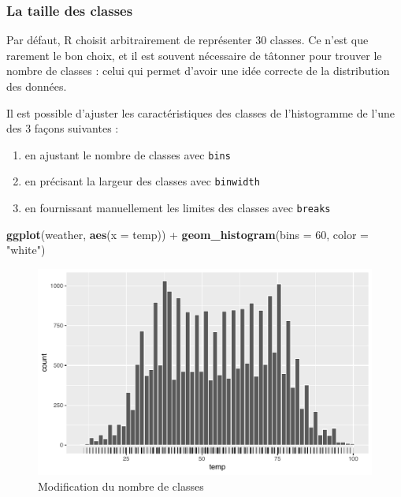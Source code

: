 \documentclass[a4paperpaper,]{article}
\newenvironment{Shaded}{\begin{snugshade}}{\end{snugshade}}
\newcommand{\DataTypeTok}[1]{\textcolor[rgb]{0.00,0.34,0.68}{#1}}
\newcommand{\DecValTok}[1]{\textcolor[rgb]{0.69,0.50,0.00}{#1}}
\newcommand{\KeywordTok}[1]{\textcolor[rgb]{0.12,0.11,0.11}{\textbf{#1}}}
\newcommand{\NormalTok}[1]{\textcolor[rgb]{0.12,0.11,0.11}{#1}}
\newcommand{\OperatorTok}[1]{\textcolor[rgb]{0.12,0.11,0.11}{#1}}
\newcommand{\StringTok}[1]{\textcolor[rgb]{0.75,0.01,0.01}{#1}}
\providecommand{\tightlist}{%
  \setlength{\itemsep}{0pt}\setlength{\parskip}{0pt}}
\theoremstyle{definition}
\theoremstyle{definition}
\theoremstyle{definition}
\theoremstyle{remark}
\begin{document}
\hypertarget{la-taille-des-classes}{%
\subsubsection{La taille des classes}\label{la-taille-des-classes}}

Par défaut, R choisit arbitrairement de représenter 30 classes. Ce n'est
que rarement le bon choix, et il est souvent nécessaire de tâtonner pour
trouver le nombre de classes : celui qui permet d'avoir une idée
correcte de la distribution des données.

Il est possible d'ajuster les caractéristiques des classes de
l'histogramme de l'une des 3 façons suivantes :

\begin{enumerate}
\def\labelenumi{\arabic{enumi}.}
\tightlist
\item
  en ajustant le nombre de classes avec \texttt{bins}
\item
  en précisant la largeur des classes avec \texttt{binwidth}
\item
  en fournissant manuellement les limites des classes avec
  \texttt{breaks}
\end{enumerate}

\begin{Shaded}
\begin{Highlighting}[]
\KeywordTok{ggplot}\NormalTok{(weather, }\KeywordTok{aes}\NormalTok{(}\DataTypeTok{x =}\NormalTok{ temp)) }\OperatorTok{+}
\StringTok{  }\KeywordTok{geom_histogram}\NormalTok{(}\DataTypeTok{bins =} \DecValTok{60}\NormalTok{, }\DataTypeTok{color =} \StringTok{"white"}\NormalTok{)}
\end{Highlighting}
\end{Shaded}

\begin{figure}[htpb]

{\centering \includegraphics[width=0.9\linewidth]{figure/unnamed-chunk-49-1} 

}

\caption{Modification du nombre de classes}\label{fig:unnamed-chunk-49}
\end{figure}
\end{document}
